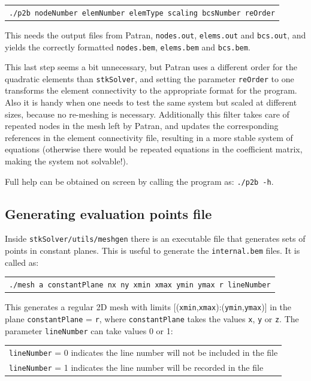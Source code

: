 \documentclass[12pt]{article}
\begin{document}
\begin{tabular}{l}
\texttt{./p2b nodeNumber elemNumber elemType scaling bcsNumber reOrder}
\end{tabular}

This needs the output files from Patran, \verb+nodes.out+, \verb+elems.out+ and \verb+bcs.out+, and yields the correctly formatted \verb+nodes.bem+, \verb+elems.bem+ and \verb+bcs.bem+.

This last step seems a bit unnecessary, but Patran uses a different order for the quadratic elements than \verb+stkSolver+, and setting the parameter \verb+reOrder+ to one transforms the element connectivity to the appropriate format for the program. Also it is handy when one needs to test the same system but scaled at different sizes, because no re-meshing is necessary. Additionally  this filter takes care of repeated nodes in the mesh left by Patran, and updates the corresponding references in the element connectivity file, resulting in a more stable system of equations (otherwise there would be repeated equations in the coefficient matrix, making the system not solvable!).

Full help can be obtained on screen by calling the program as: \texttt{./p2b -h}.

\subsection{Generating evaluation points file}\label{meshgen}
Inside \verb+stkSolver/utils/meshgen+ there is an executable file that generates sets of points in constant planes. This is useful to generate the \verb+internal.bem+ files. It is called as:

\begin{tabular}{l}
\texttt{./mesh a constantPlane nx ny xmin xmax ymin ymax r lineNumber}
\end{tabular}

This generates a regular 2D mesh with limits [(\verb+xmin+,\verb+xmax+):(\verb+ymin+,\verb+ymax+)] in the plane
\verb+constantPlane+ = \verb+r+, where \verb+constantPlane+ takes the values \verb+x+, \verb+y+ or \verb+z+. The parameter \verb+lineNumber+ can take values 0 or 1:

\begin{tabular}{l}
\texttt{lineNumber} = 0 indicates the line number will not be included in the file\\
\texttt{lineNumber} = 1 indicates the line number will be recorded in the file\\
\end{tabular}
\end{document}
